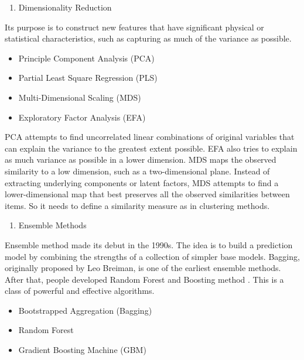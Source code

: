 \documentclass[12pt,]{krantz}
\providecommand{\tightlist}{%
  \setlength{\itemsep}{0pt}\setlength{\parskip}{0pt}}
\theoremstyle{definition}
\theoremstyle{definition}
\theoremstyle{remark}
\begin{document}
\begin{enumerate}
\def\labelenumi{\arabic{enumi}.}
\setcounter{enumi}{11}
\tightlist
\item
  Dimensionality Reduction
\end{enumerate}

Its purpose is to construct new features that have significant physical
or statistical characteristics, such as capturing as much of the
variance as possible.

\begin{itemize}
\tightlist
\item
  Principle Component Analysis (PCA)
\item
  Partial Least Square Regression (PLS)
\item
  Multi-Dimensional Scaling (MDS)
\item
  Exploratory Factor Analysis (EFA)
\end{itemize}

PCA attempts to find uncorrelated linear combinations of original
variables that can explain the variance to the greatest extent possible.
EFA also tries to explain as much variance as possible in a lower
dimension. MDS maps the observed similarity to a low dimension, such as
a two-dimensional plane. Instead of extracting underlying components or
latent factors, MDS attempts to find a lower-dimensional map that best
preserves all the observed similarities between items. So it needs to
define a similarity measure as in clustering methods.

\begin{enumerate}
\def\labelenumi{\arabic{enumi}.}
\setcounter{enumi}{12}
\tightlist
\item
  Ensemble Methods
\end{enumerate}

Ensemble method made its debut in the 1990s. The idea is to build a
prediction model by combining the strengths of a collection of simpler
base models. Bagging, originally proposed by Leo Breiman, is one of the
earliest ensemble methods. After that, people developed Random Forest
\citep{Ho1998, amit1997} and Boosting method
\citep{Valiant1984, KV1989}. This is a class of powerful and effective
algorithms.

\begin{itemize}
\tightlist
\item
  Bootstrapped Aggregation (Bagging)
\item
  Random Forest
\item
  Gradient Boosting Machine (GBM)
\end{itemize}
\end{document}
